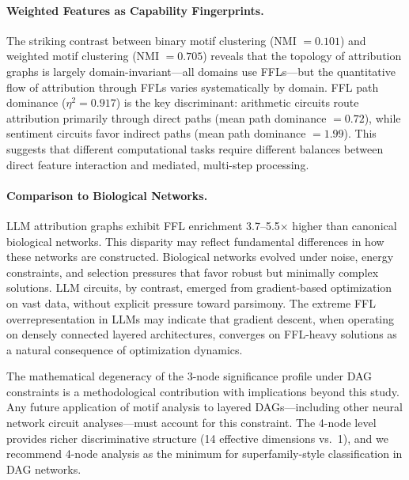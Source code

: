 \documentclass[11pt,letterpaper]{article}
\begin{document}
\paragraph{Weighted Features as Capability Fingerprints.}
The striking contrast between binary motif clustering (NMI $= 0.101$) and weighted motif clustering (NMI $= 0.705$) reveals that the topology of attribution graphs is largely domain-invariant---all domains use FFLs---but the quantitative flow of attribution through FFLs varies systematically by domain. FFL path dominance ($\eta^2 = 0.917$) is the key discriminant: arithmetic circuits route attribution primarily through direct paths (mean path dominance $= 0.72$), while sentiment circuits favor indirect paths (mean path dominance $= 1.99$). This suggests that different computational tasks require different balances between direct feature interaction and mediated, multi-step processing.

\paragraph{Comparison to Biological Networks.}
LLM attribution graphs exhibit FFL enrichment 3.7--5.5$\times$ higher than canonical biological networks. This disparity may reflect fundamental differences in how these networks are constructed. Biological networks evolved under noise, energy constraints, and selection pressures that favor robust but minimally complex solutions. LLM circuits, by contrast, emerged from gradient-based optimization on vast data, without explicit pressure toward parsimony. The extreme FFL overrepresentation in LLMs may indicate that gradient descent, when operating on densely connected layered architectures, converges on FFL-heavy solutions as a natural consequence of optimization dynamics.

The mathematical degeneracy of the 3-node significance profile under DAG constraints is a methodological contribution with implications beyond this study. Any future application of motif analysis to layered DAGs---including other neural network circuit analyses---must account for this constraint. The 4-node level provides richer discriminative structure (14 effective dimensions vs.\ 1), and we recommend 4-node analysis as the minimum for superfamily-style classification in DAG networks.
\end{document}
